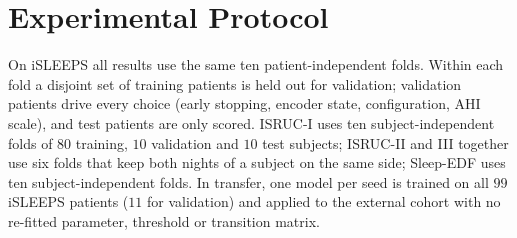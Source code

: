 \documentclass{ieeeaccess}
\begin{document}
\begin{table}[t]
\caption{Training configuration, identical across folds and cohorts.}
\label{tab:hyper}
\centering
\small
{}
\end{table}

\section{Experimental Protocol}
\label{sec:protocol}
On iSLEEPS all results use the same ten patient-independent folds. Within each fold a disjoint
set of training patients is held out for validation; validation patients drive every choice
(early stopping, encoder state, configuration, AHI scale), and test patients are only scored.
ISRUC-I uses ten subject-independent folds of $80$ training, $10$ validation and $10$ test
subjects; ISRUC-II and III together use six folds that keep both nights of a subject on the same
side; Sleep-EDF uses ten subject-independent folds. In transfer, one model per seed is trained on
all $99$ iSLEEPS patients ($11$ for validation) and applied to the external cohort with no
re-fitted parameter, threshold or transition matrix.
\end{document}
